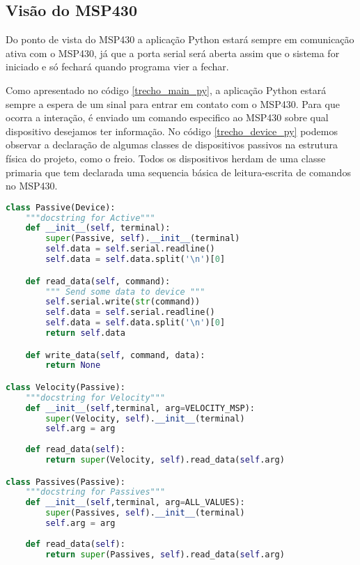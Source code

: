 \subsection{Visão do MSP430} %
\label{sub:vis_o_do_msp430}

Do ponto de vista do MSP430 a aplicação Python estará sempre em comunicação ativa com o MSP430, já que a porta serial será aberta assim que o sistema for iniciado e só fechará quando programa vier a fechar.

Como apresentado no código \ref{trecho_main_py}, a aplicação Python estará sempre a espera de um sinal para entrar em contato com o MSP430. Para que ocorra a interação, é enviado um comando especifico ao MSP430 sobre qual dispositivo desejamos ter informação. No código \ref{trecho_device_py} podemos observar a declaração de algumas classes de dispositivos passivos na estrutura física do projeto, como o freio. Todos os dispositivos herdam de uma classe primaria que tem declarada uma sequencia básica de leitura-escrita de comandos no MSP430.


\begin{lstlisting}[language=Python,caption={Declaração de classes fundamentais no script Python},label=trecho_device_py]
class Passive(Device):
    """docstring for Active"""
    def __init__(self, terminal):
        super(Passive, self).__init__(terminal)
        self.data = self.serial.readline()
        self.data = self.data.split('\n')[0]

    def read_data(self, command):
        """ Send some data to device """
        self.serial.write(str(command))
        self.data = self.serial.readline()
        self.data = self.data.split('\n')[0]
        return self.data

    def write_data(self, command, data):
        return None

class Velocity(Passive):
    """docstring for Velocity"""
    def __init__(self,terminal, arg=VELOCITY_MSP):
        super(Velocity, self).__init__(terminal)
        self.arg = arg
        
    def read_data(self):
        return super(Velocity, self).read_data(self.arg)

class Passives(Passive):
    """docstring for Passives"""
    def __init__(self,terminal, arg=ALL_VALUES):
        super(Passives, self).__init__(terminal)
        self.arg = arg
        
    def read_data(self):
        return super(Passives, self).read_data(self.arg)
\end{lstlisting}

